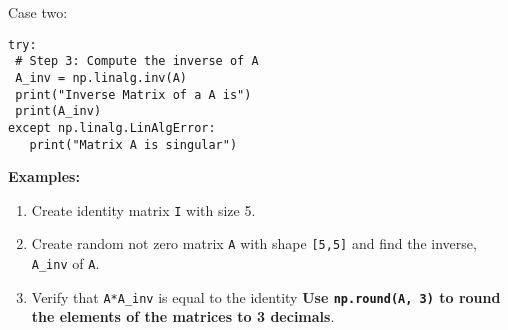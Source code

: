 \documentclass[11pt]{article}
\begin{document}
Case two:

\begin{verbatim}
try:
 # Step 3: Compute the inverse of A
 A_inv = np.linalg.inv(A)
 print("Inverse Matrix of a A is")
 print(A_inv)
except np.linalg.LinAlgError:
   print("Matrix A is singular")
\end{verbatim}

\newpage

\textbf{Examples:}

\begin{enumerate}
\def\labelenumi{\arabic{enumi}.}
\item
  Create identity matrix \texttt{I} with size 5.
\item
  Create random not zero matrix \texttt{A} with shape \texttt{{[}5,5{]}}
  and find the inverse, \texttt{A\_inv} of \texttt{A}.
\item
  Verify that \texttt{A*A\_inv} is equal to the identity \textbf{Use
  \texttt{np.round(A,\ 3)} to round the elements of the matrices to 3
  decimals}.
\end{enumerate}
\end{document}

